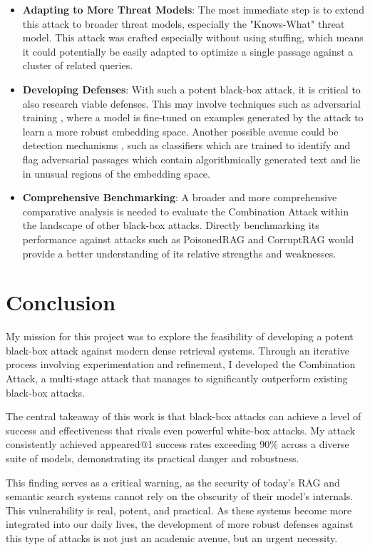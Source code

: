 \documentclass[a4paper, sigconf]{acmart}
\begin{document}
\begin{itemize}
  \item \textbf{Adapting to More Threat Models}: The most immediate step is to extend this attack to broader threat models, especially the "Knows-What" threat model. This attack was crafted especially without using stuffing, which means it could potentially be easily adapted to optimize a single passage against a cluster of related queries. 
  \item \textbf{Developing Defenses}: With such a potent black-box attack, it is critical to also research viable defenses. This may involve techniques such as adversarial training \cite{zhao2024}, where a model is fine-tuned on examples generated by the attack to learn a more robust embedding space. Another possible avenue could be detection mechanisms \cite{kazoom2025}, such as classifiers which are trained to identify and flag adversarial passages which contain algorithmically generated text and lie in unusual regions of the embedding space.  
  \item \textbf{Comprehensive Benchmarking}: A broader and more comprehensive comparative analysis is needed to evaluate the Combination Attack within the landscape of other black-box attacks. Directly benchmarking its performance against attacks such as PoisonedRAG \cite{zou2025} and CorruptRAG \cite{zhang2025-prac} would provide a better understanding of its relative strengths and weaknesses.
\end{itemize}


\section{Conclusion}

My mission for this project was to explore the feasibility of developing a potent black-box attack against modern dense retrieval systems. Through an iterative process involving experimentation and refinement, I developed the Combination Attack, a multi-stage attack that manages to significantly outperform existing black-box attacks.

The central takeaway of this work is that black-box attacks can achieve a level of success and effectiveness that rivals even powerful white-box attacks. My attack consistently achieved appeared@1 success rates exceeding 90\% across a diverse suite of models, demonstrating its practical danger and robustness. 

This finding serves as a critical warning, as the security of today's RAG and semantic search systems cannot rely on the obscurity of their model's internals. This vulnerability is real, potent, and practical. As these systems become more integrated into our daily lives, the development of more robust defenses against this type of attacks is not just an academic avenue, but an urgent necessity. 


 

\end{document}
